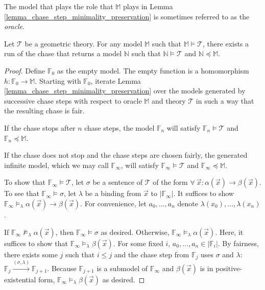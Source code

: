 		The model that plays the role that $\mathbb{M}$ plays in Lemma
		\ref{lemma_chase_step_minimality_preservation} is sometimes referred to
		as the \emph{oracle}.

		\begin{theorem}
			Let $\mathcal{T}$ be a geometric theory. For any model $\mathbb{M}$ such that
			$\mathbb{M} \models \mathcal{T}$, there exists a run of the chase that
			returns a model $\mathbb{N}$ such that $\mathbb{N} \models \mathcal{T}$ and
			$\mathbb{N} \preceq \mathbb{M}$.
		\end{theorem}

		\begin{proof}
			Define $\mathbb{F}_0$ as the empty model. The empty function is a
			homomorphism $h : \mathbb{F}_0 \to \mathbb{M}$. Starting with
			$\mathbb{F}_0$, iterate Lemma
			\ref{lemma_chase_step_minimality_preservation} over the models
			generated by successive chase steps with respect to oracle
			$\mathbb{M}$ and theory $\mathcal{T}$ in such a way that the
			resulting chase is fair.

			If the chase stops after $n$ chase steps, the model $\mathbb{F}_n$
			will satisfy $\mathbb{F}_n \models \mathcal{T}$ and $\mathbb{F}_n
			\preceq \mathbb{M}$.

			If the chase does not stop and the chase steps are chosen fairly,
			the generated infinite model, which we may call
			$\mathbb{F}_\infty$, will satisfy $\mathbb{F}_\infty \models
			\mathcal{T}$ and $\mathbb{F}_\infty \preceq \mathbb{M}$.

			To show that $\mathbb{F}_\infty \models \mathcal{T}$, let $\sigma$
			be a sentence of $\mathcal{T}$ of the form $\forall\ \vec{x} :
			\alpha(\vec x) \to \beta(\vec x)$. To see that $\mathbb{F}_\infty
			\models \sigma$, let $\lambda$ be a binding from $\vec x$ to
			$|\mathbb{F}_\infty|$. It suffices to show $\mathbb{F}_\infty
			\models_\lambda \alpha(\vec x) \to \beta(\vec x)$. For convenience,
			let $a_0,\ldots,a_n$ denote $\lambda(x_0),\ldots,\lambda(x_n)$.

			If $\mathbb{F}_\infty \not\models_\lambda \alpha(\vec x)$, then
			$\mathbb{F}_\infty \models \sigma$ as desired. Otherwise,
			$\mathbb{F}_\infty \models_\lambda \alpha(\vec x)$. Here, it
			suffices to show that $\mathbb{F}_\infty \models_\lambda \beta(\vec
			x)$. For some fixed $i$, $a_0,\ldots,a_n \in |\mathbb{F}_i|$. By
			fairness, there exists some $j$ such that $i \le j$ and the chase
			step from $\mathbb{F}_j$ uses $\sigma$ and $\lambda$: $\mathbb{F}_j
			\xrightarrow{(\sigma,\lambda)} \mathbb{F}_{j+1}$. Because
			$\mathbb{F}_{j+1}$ is a submodel of $\mathbb{F}_\infty$ and
			$\beta(\vec x)$ is in positive-existential form, $\mathbb{F}_\infty
			\models_\lambda \beta(\vec x)$ as desired.
		\end{proof}

